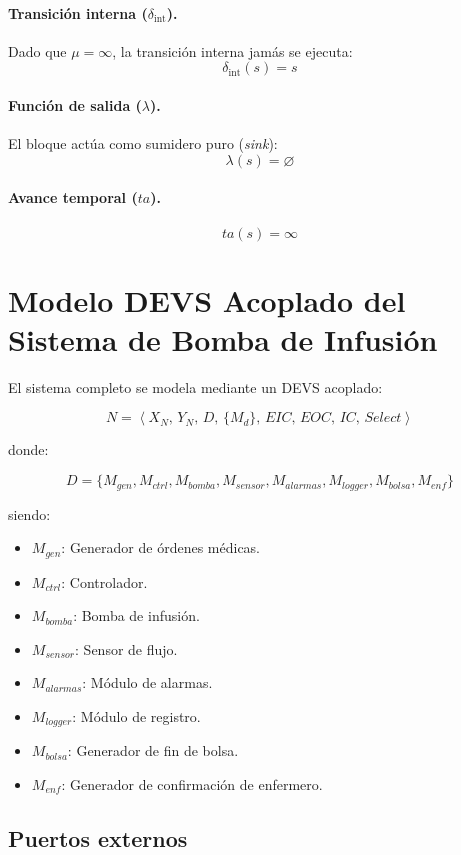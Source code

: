 \documentclass{article}
\newcommand{\dint}{\delta_{\mathrm{int}}}
\begin{document}
\paragraph{Transición interna ($\dint$).}
Dado que $\mu = \infty$, la transición interna jamás se ejecuta:
\[
  \dint(s) = s
\]

\paragraph{Función de salida ($\lambda$).}
El bloque actúa como sumidero puro (\textit{sink}):
\[
  \lambda(s) = \varnothing
\]

\paragraph{Avance temporal ($ta$).}
\[
  ta(s) = \infty
\]

\section{Modelo DEVS Acoplado del Sistema de Bomba de Infusión}

El sistema completo se modela mediante un DEVS acoplado:

\[
N =
\left<
X_N,\,
Y_N,\,
D,\,
\{M_d\},\,
EIC,\,
EOC,\,
IC,\,
Select
\right>
\]

donde:

\[
D =
\{
M_{gen},
M_{ctrl},
M_{bomba},
M_{sensor},
M_{alarmas},
M_{logger},
M_{bolsa},
M_{enf}
\}
\]

siendo:

\begin{itemize}
\item $M_{gen}$: Generador de órdenes médicas.
\item $M_{ctrl}$: Controlador.
\item $M_{bomba}$: Bomba de infusión.
\item $M_{sensor}$: Sensor de flujo.
\item $M_{alarmas}$: Módulo de alarmas.
\item $M_{logger}$: Módulo de registro.
\item $M_{bolsa}$: Generador de fin de bolsa.
\item $M_{enf}$: Generador de confirmación de enfermero.
\end{itemize}

\subsection{Puertos externos}
\end{document}
